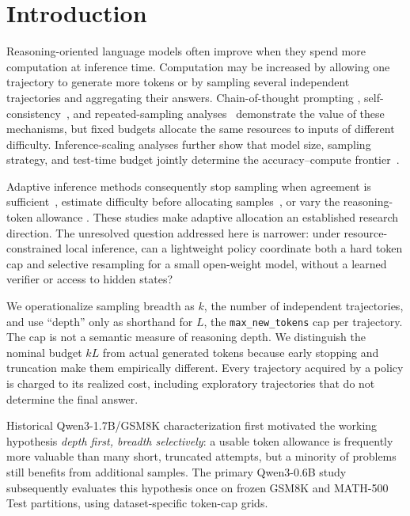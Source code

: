 \documentclass[runningheads]{llncs}
\begin{document}
\section{Introduction}

Reasoning-oriented language models often improve when they spend more
computation at inference time. Computation may be increased by allowing one
trajectory to generate more tokens or by sampling several independent
trajectories and aggregating their answers. Chain-of-thought prompting
\cite{wei2022cot}, self-consistency~\cite{wang2023selfconsistency}, and
repeated-sampling analyses~\cite{brown2024monkeys} demonstrate the value of
these mechanisms, but fixed budgets allocate the same resources to inputs of
different difficulty. Inference-scaling analyses further show that model size,
sampling strategy, and test-time budget jointly determine the
accuracy--compute frontier~\cite{wu2024inference}.

Adaptive inference methods consequently stop sampling when agreement is
sufficient~\cite{aggarwal2023adaptive,wan2025rasc}, estimate difficulty before
allocating samples~\cite{wang2025penny}, or vary the reasoning-token allowance
\cite{han2025token,wu2025thought}. These studies make adaptive allocation an
established research direction. The unresolved question addressed here is
narrower: under resource-constrained local inference, can a lightweight policy
coordinate both a hard token cap and selective resampling for a small
open-weight model, without a learned verifier or access to hidden states?

We operationalize sampling breadth as $k$, the number of independent
trajectories, and use ``depth'' only as shorthand for $L$, the
\texttt{max\_new\_tokens} cap per trajectory. The cap is not a semantic measure
of reasoning depth. We distinguish the nominal budget $kL$ from actual
generated tokens because early stopping and truncation make them empirically
different. Every trajectory acquired by a policy is charged to its realized
cost, including exploratory trajectories that do not determine the final
answer.

Historical Qwen3-1.7B/GSM8K characterization first motivated the working
hypothesis \emph{depth first, breadth selectively}: a usable token allowance
is frequently more valuable than many short, truncated attempts, but a
minority of problems still benefits from additional samples. The primary
Qwen3-0.6B study subsequently evaluates this hypothesis once on frozen
GSM8K and MATH-500 Test partitions, using dataset-specific token-cap grids.
\end{document}
